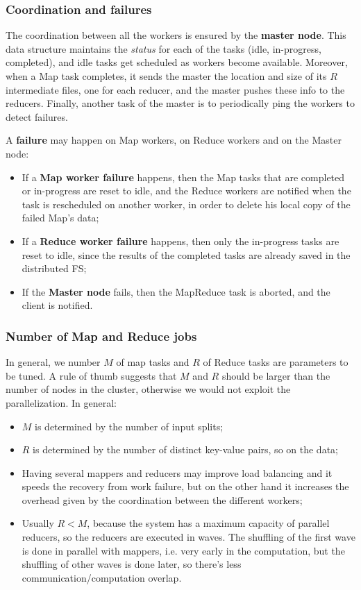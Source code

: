 \subsubsection{Coordination and failures}
The coordination between all the workers is ensured by the \textbf{master node}. This data structure maintains the \textit{status} for each of the tasks (idle, in-progress, completed), and idle tasks get scheduled as workers become available. Moreover, when a Map task completes, it sends the master the location and size of its $R$ intermediate files, one for each reducer, and the master pushes these info to the reducers. Finally, another task of the master is to periodically ping the workers to detect failures.

A \textbf{failure} may happen on Map workers, on Reduce workers and on the Master node:

\begin{itemize}
    \item If a \textbf{Map worker failure} happens, then the Map tasks that are completed or in-progress are reset to idle, and the Reduce workers are notified when the task is rescheduled on another worker, in order to delete his local copy of the failed Map's data;
    \item If a \textbf{Reduce worker failure} happens, then only the in-progress tasks are reset to idle, since the results of the completed tasks are already saved in the distributed FS;
    \item If the \textbf{Master node} fails, then the MapReduce task is aborted, and the client is notified.
\end{itemize}

\subsubsection{Number of Map and Reduce jobs}
In general, we number $M$ of map tasks and $R$ of Reduce tasks are parameters to be tuned. A rule of thumb suggests that $M$ and $R$ should be larger than the number of nodes in the cluster, otherwise we would not exploit the parallelization. In general:

\begin{itemize}
    \item $M$ is determined by the number of input splits;
    \item $R$ is determined by the number of distinct key-value pairs, so on the data;
    \item Having several mappers and reducers may improve load balancing and it speeds the recovery from work failure, but on the other hand it increases the overhead given by the coordination between the different workers;
    \item Usually $R < M$, because the system has a maximum capacity of parallel reducers, so the reducers are executed in waves. The shuffling of the first wave is done in parallel with mappers, i.e. very early in the computation, but the shuffling of other waves is done later, so there's less communication/computation overlap.
\end{itemize}

